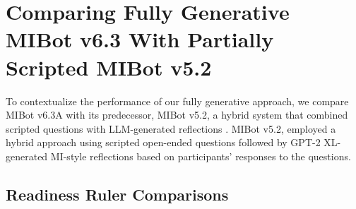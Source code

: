 \section{Comparing Fully Generative MIBot v6.3 With Partially Scripted MIBot v5.2}
\label{sec:comparison-v52}

To contextualize the performance of our fully generative approach, we compare MIBot v6.3A with its predecessor, MIBot v5.2, a hybrid system that combined scripted questions with LLM-generated reflections \citep{brown2023mi}. MIBot v5.2, employed a hybrid approach using scripted open-ended questions followed by GPT-2 XL-generated MI-style reflections based on participants' responses to the questions.

\subsection*{Readiness Ruler Comparisons}
